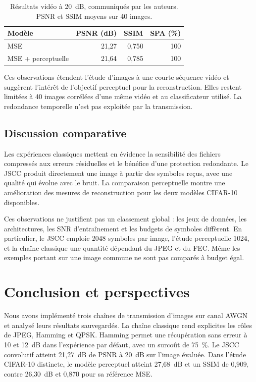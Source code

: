 \documentclass[conference]{IEEEtran}
\begin{document}
\begin{table}[!t]
\centering
\caption{Résultats vidéo à 20~dB, communiqués par les auteurs.
PSNR et SSIM moyens sur 40 images.}
\label{tab:videoresults}
\setlength{\tabcolsep}{5pt}
\begin{tabular}{lrrr}
\toprule
Modèle & PSNR (dB) & SSIM & SPA (\%) \\
\midrule
MSE & 21,27 & 0,750 & 100 \\
MSE + perceptuelle & 21,64 & 0,785 & 100 \\
\bottomrule
\end{tabular}
\end{table}

Ces observations étendent l'étude d'images à une courte séquence
vidéo et suggèrent l'intérêt de l'objectif perceptuel pour la
reconstruction. Elles restent limitées à 40 images corrélées d'une
même vidéo et au classificateur utilisé. La redondance temporelle
n'est pas exploitée par la transmission.

\subsection{Discussion comparative}
Les expériences classiques mettent en évidence la sensibilité des
fichiers compressés aux erreurs résiduelles et le bénéfice d'une
protection redondante. Le JSCC produit directement une image à
partir des symboles reçus, avec une qualité qui évolue avec le bruit.
La comparaison perceptuelle montre une amélioration des mesures
de reconstruction pour les deux modèles CIFAR-10 disponibles.

Ces observations ne justifient pas un classement global : les jeux
de données, les architectures, les SNR d'entraînement et les budgets
de symboles diffèrent. En particulier, le JSCC emploie 2048 symboles
par image, l'étude perceptuelle 1024, et la chaîne classique une
quantité dépendant du JPEG et du FEC. Même les exemples portant
sur une image commune ne sont pas comparés à budget égal.

\section{Conclusion et perspectives}
\label{sec:conclusion}
Nous avons implémenté trois chaînes de transmission d'images sur
canal AWGN et analysé leurs résultats sauvegardés. La chaîne
classique rend explicites les rôles de JPEG, Hamming et QPSK.
Hamming permet une récupération sans erreur à 10 et 12~dB dans
l'expérience par défaut, avec un surcoût de 75~\%. Le JSCC
convolutif atteint 21,27~dB de PSNR à 20~dB sur l'image évaluée.
Dans l'étude CIFAR-10 distincte, le modèle perceptuel atteint
27,68~dB et un SSIM de 0,909, contre 26,30~dB et 0,870 pour
sa référence MSE.
\end{document}
